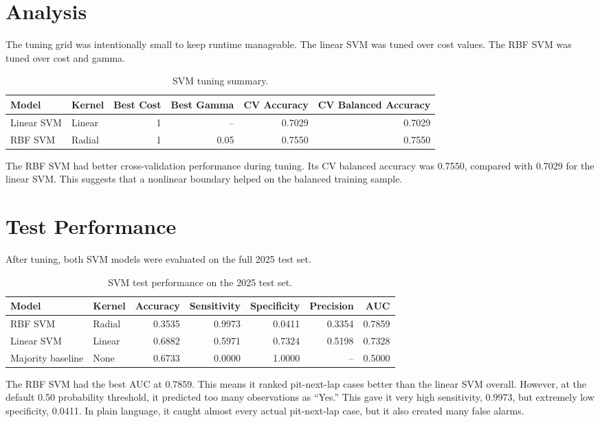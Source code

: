 \documentclass[11pt,oneside,openany]{book}
\begin{document}
\section{Analysis}

The tuning grid was intentionally small to keep runtime manageable. The linear SVM was tuned over cost values. The RBF SVM was tuned over cost and gamma.

\begin{table}[H]
\centering
\small
\caption{SVM tuning summary.}
\begin{tabular}{llrrrr}
\toprule
Model & Kernel & Best Cost & Best Gamma & CV Accuracy & CV Balanced Accuracy\\
\midrule
Linear SVM & Linear & 1 & -- & 0.7029 & 0.7029\\
RBF SVM & Radial & 1 & 0.05 & 0.7550 & 0.7550\\
\bottomrule
\end{tabular}
\end{table}

The RBF SVM had better cross-validation performance during tuning. Its CV balanced accuracy was 0.7550, compared with 0.7029 for the linear SVM. This suggests that a nonlinear boundary helped on the balanced training sample.

\section{Test Performance}

After tuning, both SVM models were evaluated on the full 2025 test set.

\begin{table}[H]
\centering
\small
\caption{SVM test performance on the 2025 test set.}
\begin{tabular}{llrrrrr}
\toprule
Model & Kernel & Accuracy & Sensitivity & Specificity & Precision & AUC\\
\midrule
RBF SVM & Radial & 0.3535 & 0.9973 & 0.0411 & 0.3354 & 0.7859\\
Linear SVM & Linear & 0.6882 & 0.5971 & 0.7324 & 0.5198 & 0.7328\\
Majority baseline & None & 0.6733 & 0.0000 & 1.0000 & -- & 0.5000\\
\bottomrule
\end{tabular}
\end{table}

The RBF SVM had the best AUC at 0.7859. This means it ranked pit-next-lap cases better than the linear SVM overall. However, at the default 0.50 probability threshold, it predicted too many observations as ``Yes.'' This gave it very high sensitivity, 0.9973, but extremely low specificity, 0.0411. In plain language, it caught almost every actual pit-next-lap case, but it also created many false alarms.
\end{document}
